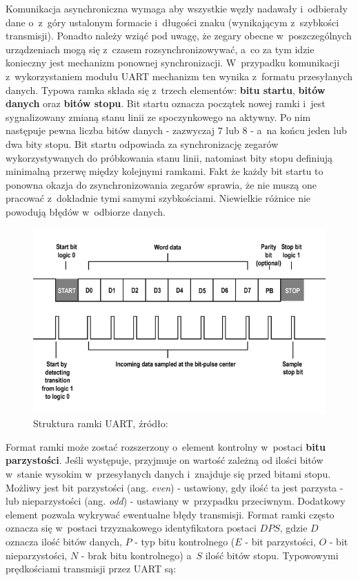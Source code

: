 Komunikacja asynchroniczna wymaga aby wszystkie węzły nadawały i~odbierały dane o~z~góry ustalonym formacie i~długości znaku (wynikającym z~szybkości transmisji). Ponadto należy wziąć pod uwagę, że zegary obecne w~poszczególnych urządzeniach mogą się z~czasem rozsynchronizowywać, a~co za tym idzie konieczny jest mechanizm ponownej synchronizacji. W~przypadku komunikacji z~wykorzystaniem modułu UART mechanizm ten wynika z~formatu przesyłanych danych. Typowa ramka składa się z~trzech elementów: \textbf{bitu startu}, \textbf{bitów danych} oraz \textbf{bitów stopu}. Bit startu oznacza początek nowej ramki i~jest sygnalizowany zmianą stanu linii ze spoczynkowego na aktywny. Po nim następuje pewna liczba bitów danych - zazwyczaj $7$ lub $8$  - a~na końcu jeden lub dwa bity stopu. Bit startu odpowiada za synchronizację zegarów wykorzystywanych do próbkowania stanu linii, natomiast bity stopu definiują minimalną przerwę między kolejnymi ramkami. Fakt że każdy bit startu to ponowna okazja do zsynchronizowania zegarów sprawia, że nie muszą one pracować z~dokładnie tymi samymi szybkościami. Niewielkie różnice nie powodują błędów w~odbiorze danych.

\begin{figure}[ht]
    \centering
    \includegraphics[scale=0.5]{img/theoretical-analysis/uart_frame.png}
    \captionsetup{format=plain,justification=centering}
    \caption{Struktura ramki UART, źródło: \cite{uart_frame}}
    \label{uart-frame}
\end{figure}

Format ramki może zostać rozszerzony o~element kontrolny w~postaci \textbf{bitu parzystości}. Jeśli występuje, przyjmuje on wartość zależną od ilości bitów w~stanie wysokim w~przesyłanych danych i~znajduje się przed bitami stopu. Możliwy jest bit parzystości (ang. \textit{even}) - ustawiony, gdy ilość ta jest parzysta - lub nieparzystości (ang. \textit{odd}) - ustawiany w~przypadku przeciwnym. Dodatkowy element pozwala wykrywać ewentualne błędy transmisji. Format ramki często oznacza się w~postaci trzyznakowego identyfikatora postaci $DPS$, gdzie $D$ oznacza ilość bitów danych, $P$ - typ bitu kontrolnego ($E$ - bit parzystości, $O$ - bit nieparzystości, $N$ - brak bitu kontrolnego) a~$S$ ilość bitów stopu. Typowowymi prędkościami transmisji przez UART są:

